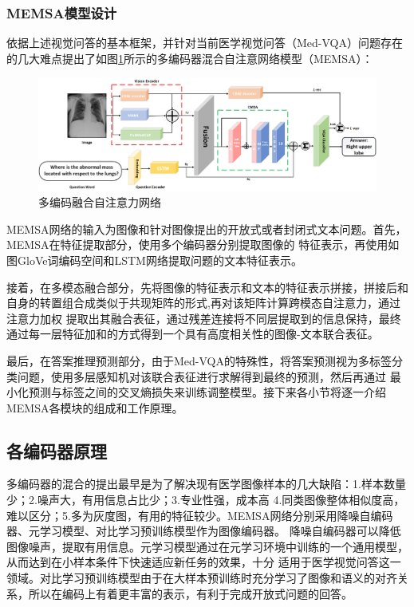 \subsubsection*{MEMSA模型设计}
依据上述视觉问答的基本框架，并针对当前医学视觉问答（Med-VQA）问题存在的几大难点提出了如图\ref{fig:memsa}所示的多编码器混合自注意网络模型（MEMSA）：
\begin{figure}[htbp]
	\centering	
	\includegraphics[width=1.1\textwidth]{Fig/myfig/chapter3/modal_net.png}  %
	\caption{\label{fig:memsa}多编码融合自注意力网络} 
\end{figure}

MEMSA网络的输入为图像和针对图像提出的开放式或者封闭式文本问题。首先，MEMSA在特征提取部分，使用多个编码器分别提取图像的
特征表示，再使用如图GloVe词编码空间和LSTM网络提取问题的文本特征表示。

接着，在多模态融合部分，先将图像的特征表示和文本的特征表示拼接，拼接后和自身的转置组合成类似于共现矩阵的形式,再对该矩阵计算跨模态自注意力，通过注意力加权
提取出其融合表征，通过残差连接将不同层提取到的信息保持，最终通过每一层特征加和的方式得到一个具有高度相关性的图像-文本联合表征。

最后，在答案推理预测部分，由于Med-VQA的特殊性，将答案预测视为多标签分类问题，使用多层感知机对该联合表征进行求解得到最终的预测，然后再通过
最小化预测与标签之间的交叉熵损失来训练调整模型。接下来各小节将逐一介绍MEMSA各模块的组成和工作原理。

\subsection{各编码器原理}
多编码器的混合的提出最早是为了解决现有医学图像样本的几大缺陷\cite{lin2021medical}：1.样本数量少；2.噪声大，有用信息占比少；3.专业性强，成本高
4.同类图像整体相似度高，难以区分；5.多为灰度图，有用的特征较少。MEMSA网络分别采用降噪自编码器、元学习模型、对比学习预训练模型作为图像编码器。
降噪自编码器可以降低图像噪声，提取有用信息。元学习模型通过在元学习环境中训练的一个通用模型，从而达到在小样本条件下快速适应新任务的效果，十分
适用于医学视觉问答这一领域。对比学习预训练模型由于在大样本预训练时充分学习了图像和语义的对齐关系，所以在编码上有着更丰富的表示，有利于完成开放式问题的回答。
